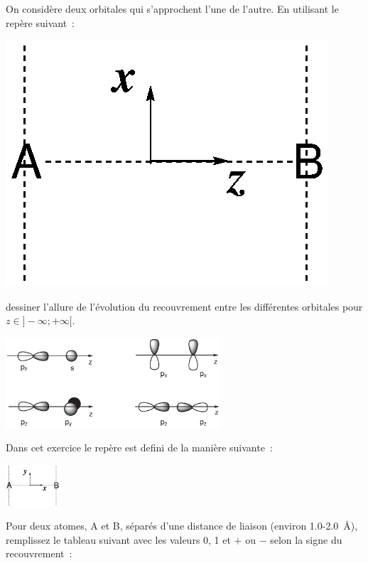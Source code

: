 On consid\`ere deux orbitales qui s'approchent l'une de l'autre.
En utilisant le repère suivant~:
\begin{minipage}[l]{0.15\linewidth}
\includegraphics[scale=0.4]{figure/AB_repere.eps}\\
\end{minipage}
dessiner l'allure de l'\'evolution du recouvrement entre les diff\'erentes orbitales
pour $z \in ]-\infty;+\infty[$.

\vspace{-0.3cm}
\begin{center}
\includegraphics[width=8.0cm]{figure/overl1.eps}
\end{center}


Dans cet exercice le rep\`ere est defini de la mani\`ere suivante~:

\includegraphics[width=2cm]{figure/AB_repere_yx.eps}

Pour deux atomes, A et B, s\'epar\'es d'une distance de liaison 
(environ 1.0-2.0~\AA), remplissez le tableau suivant avec les valeurs 0, 1 et $+$ ou $-$
selon la signe du recouvrement~:
%

